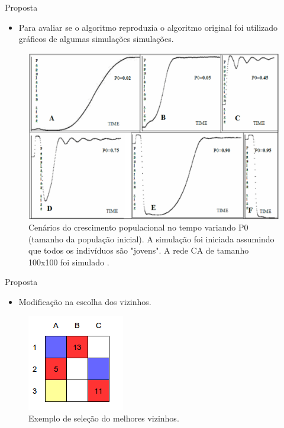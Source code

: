 \documentclass{beamer}
\begin{document}
\begin{frame}{Proposta}
	\begin{itemize}
		\item Para avaliar se o algoritmo reproduzia o algoritmo original
		foi utilizado gráficos de algumas simulações simulações.
	\end{itemize}
\begin{figure}[h!]
\centering
\includegraphics[width=.5\textwidth]{../artigo/imagens/crescimento-populacao-no-tempo}
\caption{Cenários do crescimento populacional no tempo variando P0 (tamanho 
da população inicial). A simulação foi iniciada assumindo que todos os 
indivíduos são "jovens". A rede CA de tamanho 100x100 foi simulado 
\cite{dzwinel:04}.}
\label{fig:crescimento-populacao-no-tempo}
\end{figure}
\end{frame}

\begin{frame}{Proposta}
	\begin{itemize}
		\item Modificação na escolha dos vizinhos.
	\end{itemize}
\begin{figure}[h!]
\centering
\includegraphics[width=.5\textwidth]{../artigo/imagens/escolha-melhor-vizinho}
\caption{Exemplo de seleção do melhores vizinhos.}
\label{fig:escolha-melhor-vizinho}
\end{figure}
\end{frame}
\end{document}
